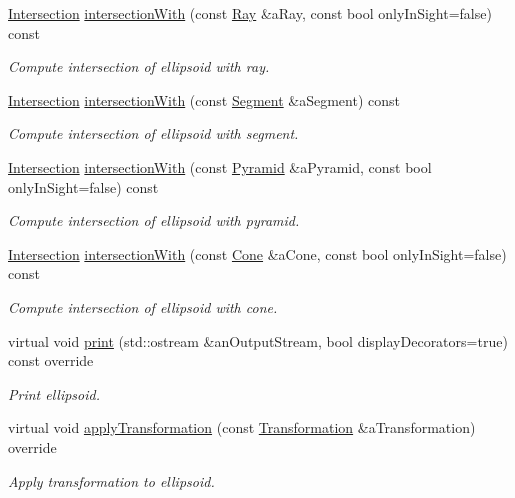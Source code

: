\begin{DoxyCompactItemize}
\hyperlink{classostk_1_1math_1_1geom_1_1d3_1_1_intersection}{Intersection} \hyperlink{classostk_1_1math_1_1geom_1_1d3_1_1objects_1_1_ellipsoid_ae062bed9d63b86032ba55db7e3d130be}{intersection\+With} (const \hyperlink{classostk_1_1math_1_1geom_1_1d3_1_1objects_1_1_ray}{Ray} \&a\+Ray, const bool only\+In\+Sight=false) const
\begin{DoxyCompactList}\small\item\em Compute intersection of ellipsoid with ray. \end{DoxyCompactList}\item 
\hyperlink{classostk_1_1math_1_1geom_1_1d3_1_1_intersection}{Intersection} \hyperlink{classostk_1_1math_1_1geom_1_1d3_1_1objects_1_1_ellipsoid_a28e2a2bfdbbcc0e4141c3cb7434a5c5a}{intersection\+With} (const \hyperlink{classostk_1_1math_1_1geom_1_1d3_1_1objects_1_1_segment}{Segment} \&a\+Segment) const
\begin{DoxyCompactList}\small\item\em Compute intersection of ellipsoid with segment. \end{DoxyCompactList}\item 
\hyperlink{classostk_1_1math_1_1geom_1_1d3_1_1_intersection}{Intersection} \hyperlink{classostk_1_1math_1_1geom_1_1d3_1_1objects_1_1_ellipsoid_aad7841b85e90ebe3ca429772c124033e}{intersection\+With} (const \hyperlink{classostk_1_1math_1_1geom_1_1d3_1_1objects_1_1_pyramid}{Pyramid} \&a\+Pyramid, const bool only\+In\+Sight=false) const
\begin{DoxyCompactList}\small\item\em Compute intersection of ellipsoid with pyramid. \end{DoxyCompactList}\item 
\hyperlink{classostk_1_1math_1_1geom_1_1d3_1_1_intersection}{Intersection} \hyperlink{classostk_1_1math_1_1geom_1_1d3_1_1objects_1_1_ellipsoid_adb4af12ad6a14e483971926822da732c}{intersection\+With} (const \hyperlink{classostk_1_1math_1_1geom_1_1d3_1_1objects_1_1_cone}{Cone} \&a\+Cone, const bool only\+In\+Sight=false) const
\begin{DoxyCompactList}\small\item\em Compute intersection of ellipsoid with cone. \end{DoxyCompactList}\item 
virtual void \hyperlink{classostk_1_1math_1_1geom_1_1d3_1_1objects_1_1_ellipsoid_a650fa20181d61ea455b98fc3330baf6e}{print} (std\+::ostream \&an\+Output\+Stream, bool display\+Decorators=true) const override
\begin{DoxyCompactList}\small\item\em Print ellipsoid. \end{DoxyCompactList}\item 
virtual void \hyperlink{classostk_1_1math_1_1geom_1_1d3_1_1objects_1_1_ellipsoid_aa7c60b942f6b1fa3a513bc3b549ab9e6}{apply\+Transformation} (const \hyperlink{classostk_1_1math_1_1geom_1_1d3_1_1_transformation}{Transformation} \&a\+Transformation) override
\begin{DoxyCompactList}\small\item\em Apply transformation to ellipsoid. \end{DoxyCompactList}\end{DoxyCompactItemize}
